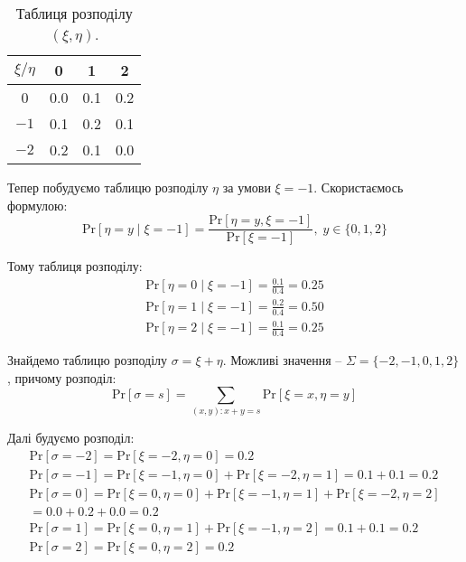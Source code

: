\documentclass[oneside,solution]{karazin-prob-theory-assign}
\begin{document}
\begin{table}
    \centering
    \begin{tabular}{c|c|c|c}
         $\xi/\eta$ & 0 & 1 & 2  \\ \hline 
         0 & 0.0 & 0.1 & 0.2 \\ \hline
         $-1$ & 0.1 & 0.2 & 0.1 \\ \hline
         $-2$ & 0.2 & 0.1 & 0.0
    \end{tabular}
    \caption{Таблиця розподілу $(\xi,\eta)$.}
    \label{tab:table_1}
\end{table}

Тепер побудуємо таблицю розподілу $\eta$ за умови $\xi=-1$. Скористаємось формулою:
\begin{equation}
    \text{Pr}[\eta = y \mid \xi = -1] = \frac{\text{Pr}[\eta=y,\xi=-1]}{\text{Pr}[\xi=-1]}, \; y \in \{0,1,2\}
\end{equation}

Тому таблиця розподілу:
\begin{gather}
    \text{Pr}[\eta=0 \mid \xi = -1] = \frac{0.1}{0.4} = 0.25 \\
    \text{Pr}[\eta=1 \mid \xi = -1] = \frac{0.2}{0.4} = 0.50 \\
    \text{Pr}[\eta=2 \mid \xi = -1] = \frac{0.1}{0.4} = 0.25
\end{gather}

Знайдемо таблицю розподілу $\sigma = \xi+\eta$. Можливі значення -- $\Sigma = \{-2, -1, 0, 1, 2\}$, причому розподіл:
\begin{equation}
    \text{Pr}[\sigma = s] = \sum_{(x,y): x+y=s} \text{Pr}[\xi=x,\eta=y]
\end{equation}

Далі будуємо розподіл:
\begin{gather}
    \text{Pr}[\sigma=-2] = \text{Pr}[\xi=-2,\eta=0] = 0.2 \\
    \text{Pr}[\sigma=-1] = \text{Pr}[\xi=-1,\eta=0] + \text{Pr}[\xi=-2,\eta=1] = 0.1 + 0.1 = 0.2 \\
    \text{Pr}[\sigma=0] = \text{Pr}[\xi=0,\eta=0] + \text{Pr}[\xi=-1,\eta=1] + \text{Pr}[\xi=-2,\eta=2] \nonumber \\ = 0.0 + 0.2 + 0.0 = 0.2 \\
    \text{Pr}[\sigma=1] = \text{Pr}[\xi=0,\eta=1] + \text{Pr}[\xi=-1,\eta=2] = 0.1 + 0.1 = 0.2 \\
    \text{Pr}[\sigma=2] = \text{Pr}[\xi=0,\eta=2] = 0.2
\end{gather}
\end{document}
